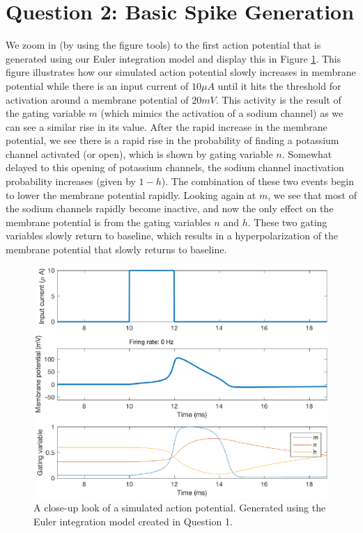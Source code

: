 \documentclass[11pt, oneside]{article}
\begin{document}
\section{Question 2: Basic Spike Generation}
We zoom in (by using the figure tools) to the first action potential that is generated using our Euler integration model and display this in Figure \ref{fig:action_potential_close_up}. This figure illustrates how our simulated action potential slowly increases in membrane potential while there is an input current of $10\mu A$ until it hits the threshold for activation around a membrane potential of $20mV$. This activity is the result of the gating variable $m$ (which mimics the activation of a sodium channel) as we can see a similar rise in its value. After the rapid increase in the membrane potential, we see there is a rapid rise in the probability of finding a potassium channel activated (or open), which is shown by gating variable $n$. Somewhat delayed to this opening of potassium channels, the sodium channel inactivation probability increases (given by $1-h$). The combination of these two events begin to lower the membrane potential rapidly. Looking again at $m$, we see that most of the sodium channels rapidly become inactive, and now the only effect on the membrane potential is from the gating variables $n$ and $h$. These two gating variables slowly return to baseline, which results in a hyperpolarization of the membrane potential that slowly returns to baseline.

\begin{figure}[ht!]
\centering
\includegraphics[width=1\textwidth]{simulate_hh_action_potential.eps}
\caption{A close-up look of a simulated action potential. Generated using the Euler integration model created in Question 1.}
\label{fig:action_potential_close_up}
\end{figure}
\end{document}
